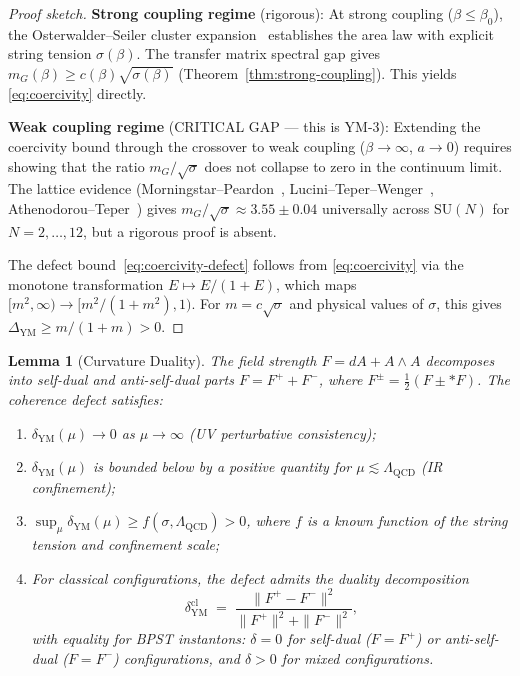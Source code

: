 \documentclass[11pt]{article}
\newtheorem{lemma}[theorem]{Lemma}
\begin{document}
\begin{proof}[Proof sketch]
\textbf{Strong coupling regime} (rigorous): At strong coupling
($\beta \leq \beta_0$), the Osterwalder--Seiler cluster
expansion~\cite{OS} establishes the area law with explicit string
tension $\sigma(\beta)$.  The transfer matrix spectral gap gives
$m_G(\beta) \geq c(\beta)\sqrt{\sigma(\beta)}$
(Theorem~\ref{thm:strong-coupling}).  This yields
\eqref{eq:coercivity} directly.

\textbf{Weak coupling regime} (CRITICAL GAP --- this is YM-3):
Extending the coercivity bound through the crossover to weak coupling
($\beta \to \infty$, $a \to 0$) requires showing that the ratio
$m_G/\sqrt{\sigma}$ does not collapse to zero in the continuum limit.
The lattice evidence (Morningstar--Peardon~\cite{MP},
Lucini--Teper--Wenger~\cite{LTW}, Athenodorou--Teper~\cite{AT}) gives
$m_G/\sqrt{\sigma} \approx 3.55 \pm 0.04$ universally across
$\mathrm{SU}(N)$ for $N = 2, \ldots, 12$, but a rigorous proof is
absent.

The defect bound~\eqref{eq:coercivity-defect} follows from
\eqref{eq:coercivity} via the monotone transformation
$E \mapsto E/(1+E)$, which maps $[m^2, \infty) \to [m^2/(1+m^2), 1)$.
For $m = c\sqrt{\sigma}$ and physical values of $\sigma$, this gives
$\Delta_{\mathrm{YM}} \geq m/(1+m) > 0$.
\end{proof}

\begin{lemma}[Curvature Duality]
\label{lem:curvature-duality}
The field strength $F = dA + A \wedge A$ decomposes into self-dual and
anti-self-dual parts $F = F^+ + F^-$, where $F^\pm = \tfrac{1}{2}(F \pm {*}F)$.
The coherence defect satisfies:
\begin{enumerate}
  \item[(i)] $\delta_{\mathrm{YM}}(\mu) \to 0$ as $\mu \to \infty$
    (UV perturbative consistency);
  \item[(ii)] $\delta_{\mathrm{YM}}(\mu)$ is bounded below by a
    positive quantity for $\mu \lesssim \Lambda_{\mathrm{QCD}}$
    (IR confinement);
  \item[(iii)] $\sup_\mu \delta_{\mathrm{YM}}(\mu) \geq
    f(\sigma, \Lambda_{\mathrm{QCD}}) > 0$, where $f$ is a known
    function of the string tension and confinement scale;
  \item[(iv)] For classical configurations, the defect admits the
    duality decomposition
    \begin{equation}\label{eq:duality-decomp}
      \delta_{\mathrm{YM}}^{\mathrm{cl}}
      \;=\;
      \frac{\|F^+ - F^-\|^2}{\|F^+\|^2 + \|F^-\|^2},
    \end{equation}
    with equality for BPST instantons: $\delta = 0$ for self-dual
    ($F = F^+$) or anti-self-dual ($F = F^-$) configurations, and
    $\delta > 0$ for mixed configurations.
\end{enumerate}
\end{lemma}
\end{document}
